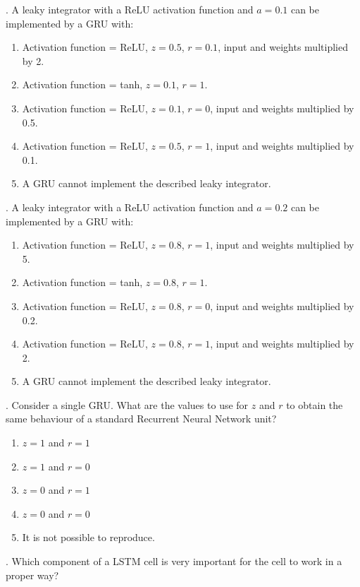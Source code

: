 . A leaky integrator with a ReLU activation function and $a=0.1$ can be implemented by a GRU with:

\begin{enumerate}[label=\roman*]
    \item Activation function = ReLU, $z=0.5$, $r=0.1$, input and weights multiplied by 2.
    \item Activation function = tanh, $z=0.1$, $r=1$.
    \item Activation function = ReLU, $z=0.1$, $r=0$, input and weights multiplied by 0.5.
    \item Activation function = ReLU, $z=0.5$, $r=1$, input and weights multiplied by 0.1.
    \item A GRU cannot implement the described leaky integrator.
\end{enumerate}

\newpage
{}. A leaky integrator with a ReLU activation function and $a=0.2$ can be implemented by a GRU with:

\begin{enumerate}[label=\roman*]
    \item Activation function = ReLU, $z=0.8$, $r=1$, input and weights multiplied by 5.
    \item Activation function = tanh, $z=0.8$, $r=1$.
    \item Activation function = ReLU, $z=0.8$, $r=0$, input and weights multiplied by 0.2.
    \item Activation function = ReLU, $z=0.8$, $r=1$, input and weights multiplied by 2.
    \item A GRU cannot implement the described leaky integrator.
\end{enumerate}


. Consider a single GRU. What are the values to use for $z$ and $r$ to obtain the same behaviour of a standard Recurrent Neural Network unit?

\begin{enumerate}[label=\roman*]
    \item $z=1$ and $r=1$
    \item $z=1$ and $r=0$
    \item $z=0$ and $r=1$
    \item $z=0$ and $r=0$
    \item It is not possible to reproduce.
\end{enumerate}

. Which component of a LSTM cell is very important for the cell to work in a proper way?

